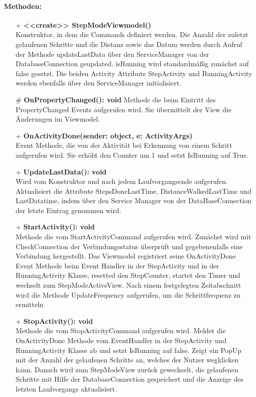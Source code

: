 \documentclass[a4paper,12pt]{article}
\begin{document}
\paragraph{Methoden:}
\begin{itemize}
	\item[+] \textbf{<<create>> StepModeViewmodel()}\\ Konstruktor, in dem die Commands definiert werden. Die Anzahl der zuletzt gelaufenen Schritte und die Distanz sowie das Datum werden durch Aufruf der Methode updateLastData über den ServiceManager von der DatabaseConnection geupdated. isRunning wird standardmäßig zunächst auf false gesetzt. Die beiden Activity Attribute StepActivity und RunningActivity werden ebenfalls über den ServiceManager initialisiert.
	\item[\#] \textbf{OnPropertyChanged(): void} Methode die beim Eintritt des PropertyChanged Events aufgerufen wird. Sie übermittelt der View die Änderungen im Viewmodel.
	\item[+] \textbf{OnActivityDone(sender: object, e: ActivityArgs)} \\ Event Methode, die von der Aktivität bei Erkennung von einem Schritt aufgerufen wird. Sie erhöht den Counter um 1 und setzt IsRunning auf True. 
	\item[+] \textbf{UpdateLastData(): void} \\ Wird vom Konstruktor und nach jedem Laufvorgangsende aufgerufen. Aktualisiert die Attribute StepsDoneLastTime, DistanceWalkedLastTime und LastDatatime, indem über den Service Manager von der DataBaseConnection der letzte Eintrag genommen wird. 
	\item[+] \textbf{StartActivity(): void}\\ Methode die vom StartActivityCommand aufgerufen wird. Zunächst wird mit CheckConnection der Verbindungsstatus überprüft und gegebenenfalls eine Verbindung hergestellt. Das Viewmodel registriert seine OnActivityDone Event Methode beim Event Handler in der StepActivity und in der RunningActivity Klasse, resetted den StepCounter, startet den Timer und wechselt zum StepModeActiveView. Nach einem festgelegten Zeitabschnitt wird die Methode UpdateFrequency aufgerufen, um die Schrittfrequenz zu ermitteln
	\item[+] \textbf {StopActivity(): void}\\ Methode die vom StopActivityCommand aufgerufen wird. Meldet die OnActivityDone Methode vom EventHandler in der StepActivity und RunningActivity Klasse ab und setzt IsRunning auf false. Zeigt ein PopUp mit der Anzahl der gelaufenen Schritte an, welches der Nutzer wegklicken kann. Danach wird zum StepModeView zurück gewechselt, die gelaufenen Schritte mit Hilfe der DatabaseConnection gespeichert und die Anzeige des letzten Laufvorgangs aktualisiert.  

\end{itemize}
\end{document}
